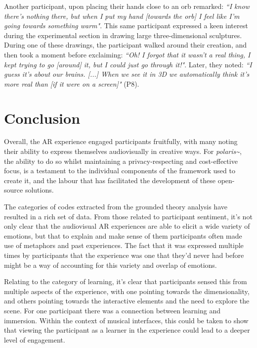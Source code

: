 Another participant, upon placing their hands close to an orb remarked: \textit{``I know there’s nothing there, but when I put my hand [towards the orb] I feel like I’m going towards something warm"}. This same participant expressed a keen interest during the experimental section in drawing large three-dimensional sculptures. During one of these drawings, the participant walked around their creation, and then took a moment before exclaiming: \textit{``Oh! I forgot that it wasn’t a real thing, I kept trying to go [around] it, but I could just go through it!"}. Later, they noted: \textit{``I guess it’s about our brains. [...] When we see it in 3D we automatically think it’s more real than [if it were on a screen]"} (P8).

\section{Conclusion}\label{sec: polaris-conclusion}
Overall, the AR experience engaged participants fruitfully, with many noting their ability to express themselves audiovisually in creative ways. For \textit{polaris\textasciitilde{}}, the ability to do so whilst maintaining a privacy-respecting and cost-effective focus, is a testament to the individual components of the framework used to create it, and the labour that has facilitated the development of these open-source solutions.

The categories of codes extracted from the grounded theory analysis have resulted in a rich set of data. From those related to participant sentiment, it’s not only clear that the audiovisual AR experiences are able to elicit a wide variety of emotions, but that to explain and make sense of them participants often made use of metaphors and past experiences. The fact that it was expressed multiple times by participants that the experience was one that they’d never had before might be a way of accounting for this variety and overlap of emotions.

Relating to the category of learning, it’s clear that participants sensed this from multiple aspects of the experience, with one pointing towards the dimensionality, and others pointing towards the interactive elements and the need to explore the scene. For one participant there was a connection between learning and immersion. Within the context of musical interfaces, this could be taken to show that viewing the participant as a learner in the experience could lead to a deeper level of engagement.


